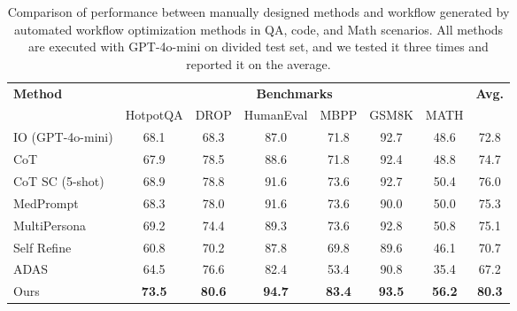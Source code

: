 \documentclass{article} %
\theoremstyle{plain}
\theoremstyle{definition}
\theoremstyle{remark}
\begin{document}
\begin{table}[!htbp]
\caption{Comparison of performance between manually designed methods and workflow generated by automated workflow optimization methods in QA, code, and Math scenarios. All methods are executed with GPT-4o-mini on divided test set, and we tested it three times and reported it on the average.}
\scriptsize
\renewcommand\tabcolsep{3.2pt}
\renewcommand\arraystretch{1.2}
\small
\setlength{\abovecaptionskip}{0.1cm}
\setlength{\belowcaptionskip}{-0.2cm}
\centering
\begin{tabular}{l|cccccc|c}
\hline

\hline

\hline

\hline
\multirow{2}{*}{\textbf{Method}} & \multicolumn{6}{c|}{\textbf{Benchmarks}}  & \multirow{2}{*}{\textbf{Avg.}}\\
& HotpotQA & DROP & HumanEval & MBPP & GSM8K & MATH & \\
\hline

\hline
IO (GPT-4o-mini) & 68.1 & 68.3 &  87.0 & 71.8 & 92.7 & 48.6 & 72.8 \\
CoT~\citep{wei2022COT} & 67.9 & 78.5 &  88.6 & 71.8 & 92.4 &  48.8 & 74.7 \\
CoT SC (5-shot)~\citep{wang2022COTSC} & 68.9 & 78.8 & 91.6 & 73.6 & 92.7 & 50.4 & 76.0 \\
MedPrompt~\citep{nori2023medprompt} & 68.3 & 78.0 & 91.6 & 73.6 & 90.0 & 50.0 & 75.3 \\ 
MultiPersona~\citep{wang2023multipersona} & 69.2 & 74.4 & 89.3 & 73.6 & 92.8 & 50.8 & 75.1\\
Self Refine~\citep{madaan2023self} & 60.8 & 70.2 & 87.8 & 69.8 & 89.6 & 46.1 & 70.7\\
\hline
ADAS~\citep{hu2024automated} & 64.5 & 76.6 & 82.4 & 53.4 & 90.8 & 35.4 &  67.2\\
\rowcolor[gray]{.8}
Ours & \textbf{73.5} & \textbf{80.6} & \textbf{94.7} & \textbf{83.4} & \textbf{93.5} & \textbf{56.2} & \textbf{80.3} \\
\hline

\hline

\hline

\hline
\end{tabular}
\label{tab:main result}
\vspace{-3mm}
\end{table}
\end{document}
